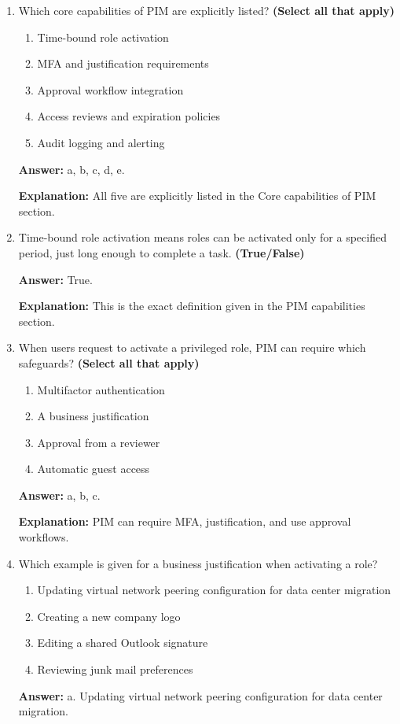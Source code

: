 \documentclass[10pt]{article}
\begin{document}
\begin{enumerate}[leftmargin=*]
\textbf{Explanation:} this exact example to illustrate temporary elevation and automatic deactivation.

\item Which core capabilities of PIM are explicitly listed? \textbf{(Select all that apply)}
\begin{enumerate}[label=\alph*., leftmargin=1.5em]
\item Time-bound role activation
\item MFA and justification requirements
\item Approval workflow integration
\item Access reviews and expiration policies
\item Audit logging and alerting
\end{enumerate}
\textbf{Answer:} a, b, c, d, e.

\textbf{Explanation:} All five are explicitly listed in the Core capabilities of PIM section.

\item Time-bound role activation means roles can be activated only for a specified period, just long enough to complete a task. \textbf{(True/False)}

\textbf{Answer:} True.

\textbf{Explanation:} This is the exact definition given in the PIM capabilities section.

\item When users request to activate a privileged role, PIM can require which safeguards? \textbf{(Select all that apply)}
\begin{enumerate}[label=\alph*., leftmargin=1.5em]
\item Multifactor authentication
\item A business justification
\item Approval from a reviewer
\item Automatic guest access
\end{enumerate}
\textbf{Answer:} a, b, c.

\textbf{Explanation:} PIM can require MFA, justification, and use approval workflows.

\item Which example is given for a business justification when activating a role?
\begin{enumerate}[label=\alph*., leftmargin=1.5em]
\item Updating virtual network peering configuration for data center migration
\item Creating a new company logo
\item Editing a shared Outlook signature
\item Reviewing junk mail preferences
\end{enumerate}
\textbf{Answer:} a. Updating virtual network peering configuration for data center migration.


\end{enumerate}
\end{document}
